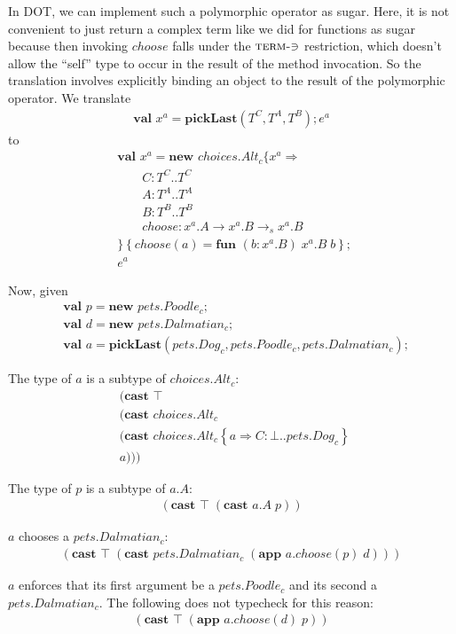 \documentclass[9pt]{sigplanconf}
\newcommand{\mi}[1]{\mathit{#1}}
\newcommand{\gap}{\quad\quad}
\newcommand{\tfun}{\rightarrow}
\newcommand{\refine}[2]{\left\{#1 \Rightarrow #2 \right\}}
\newcommand{\mlrefine}[2]{\{#1 \Rightarrow #2 \}}
\newcommand{\ldefs}[1]{\left\{#1\right\}}
\newcommand{\mlnew}[3]{\textbf{val }#1 = \textbf{new }#2 ;\;\\&#3}
\newcommand{\Ldecl}[3]{#1 : #2..#3}%
\newcommand{\mdecl}[3]{#1 : #2 \tfun #3}
\newcommand{\Top}{\top}%
\newcommand{\Bot}{\bot}%
\newcommand{\arrow}[2]{#1\rightarrow_s#2}
\newcommand{\fun}[4]{\textbf{fun } (#1:#2)\;#3\;#4}
\newcommand{\app}[2]{(\textbf{app }#1\;#2)}
\newcommand{\cast}[2]{(\textbf{cast }#1\;#2)}
\begin{document}
In DOT, we can implement such a polymorphic operator as sugar. Here,
it is not convenient to just return a complex term like we did for
functions as sugar because then invoking $\mi{choose}$ falls under the
$\textsc{term-$\ni$}$ restriction, which doesn't allow the ``self''
type to occur in the result of the method invocation. So the
translation involves explicitly binding an object to the result of the
polymorphic operator. We translate
\begin{align*}
\textbf{val } x^a = \textbf{pickLast}(T^C, T^A, T^B); e^a
\end{align*}
to
\begin{align*}
&\mlnew {x^a} {\mi{choices.Alt_c} \mlrefine {x^a} {\\
&\gap\Ldecl C {T^C} {T^C}\\
&\gap\Ldecl A {T^A} {T^A}\\
&\gap\Ldecl B {T^B} {T^B}\\
&\gap\mdecl {\mi{choose}} {x^a.A} {\arrow {x^a.B} {x^a.B}}\\
&}\ldefs{\mi{choose}(a)=\fun b {x^a.B} {x^a.B} b}}
{e^a}
\end{align*}

Now, given
\begin{align*}
&\mlnew p {\mi{pets.Poodle_c}}
{\mlnew d {\mi{pets.Dalmatian_c}}
{\textbf{val } a = \textbf{pickLast}({\mi{pets.Dog_c}}, {\mi{pets.Poodle_c}}, {\mi{pets.Dalmatian_c}});}}
\end{align*}

The type of $a$ is a subtype of ${\mi{choices.Alt_c}}$:
\begin{align*}
&\cast \Top {\\
&\cast {\mi{choices.Alt_c}} {\\
&\cast {{\mi{choices.Alt_c}} \refine a {\Ldecl C \Bot {\mi{pets.Dog_c}}}} {\\
&a}}}
\end{align*}

The type of $p$ is a subtype of $a.A$:
\begin{align*}
\cast \Top {\cast {a.A} {p}}
\end{align*}

$a$ chooses a $\mi{pets.Dalmatian_c}$:
\begin{align*}
\cast \Top {\cast {\mi{pets.Dalmatian_c}} {\app {a.choose(p)} d}}
\end{align*}

$a$ enforces that its first argument be a $\mi{pets.Poodle_c}$ and its second a $\mi{pets.Dalmatian_c}$. The following does not typecheck for this reason:
\begin{align*}
\cast \Top {\app {a.choose(d)} p}
\end{align*}
\end{document}
